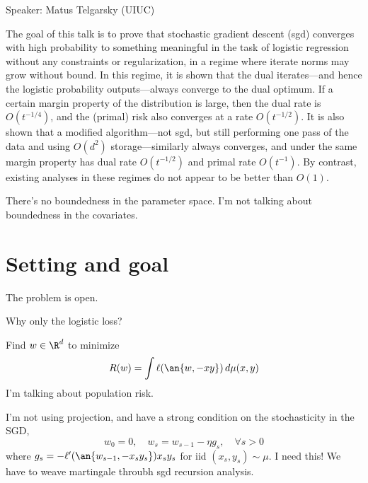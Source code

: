 \def\filepath{C:/Users/oldhe/Dropbox/Math/templates}






\pagestyle{fancy}
\chead{} 
\rhead{} 
\lfoot{} 
\cfoot{\thepage} 
\rfoot{} 
\renewcommand{\headrulewidth}{.3pt} 
\setlength\voffset{0in}
\setlength\textheight{648pt}





Speaker: Matus Telgarsky (UIUC)

%
The goal of this talk is to prove that stochastic gradient descent (sgd) converges with high probability to something meaningful in the task of logistic regression without any constraints or regularization, in a regime where iterate norms may grow without bound. In this regime, it is shown that the dual iterates---and hence the logistic probability outputs---always converge to the dual optimum. If a certain margin property of the distribution is large, then the dual rate is $O(t^{-1/4})$, and the (primal) risk also converges at a rate $O(t^{-1/2})$. It is also shown that a modified algorithm---not sgd, but still performing one pass of the data and using $O(d^2)$ storage---similarly always converges, and under the same margin property has dual rate $O(t^{-1/2})$ and primal rate $O(t^{-1})$. By contrast, existing analyses in these regimes do not appear to be better than $O(1)$.


There's no boundedness in the parameter space. I'm not talking about boundedness in the covariates.

\section{Setting and goal}

The problem is open.


Why only the logistic loss?

Find $w\in \R^d$ to minimize
$$
R(w) = \int \ell(\an{w,-xy})\,d\mu(x,y)
$$
I'm talking about population risk.

I'm not using projection, and have a strong condition on the stochasticity in the SGD, 
$$
w_0=0,\quad w_s=w_{s-1} - \eta g_s, \quad\forall s>0
$$
where $g_s=-\ell'(\an{w_{s-1}, -x_sy_s})x_sy_s$ for iid $(x_s,y_s)\sim \mu$.
I need this! We have to weave martingale throubh sgd recursion analysis.
 
